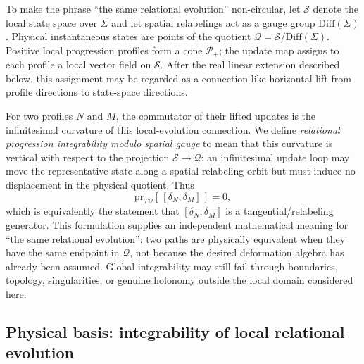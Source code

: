 \documentclass[11pt]{article}
\begin{document}
To make the phrase ``the same relational evolution'' non-circular, let $\mathcal S$ denote the local state space over $\Sigma$ and let spatial relabelings act as a gauge group $\mathrm{Diff}(\Sigma)$. Physical instantaneous states are points of the quotient $\mathcal Q=\mathcal S/\mathrm{Diff}(\Sigma)$. Positive local progression profiles form a cone $\mathcal P_+$; the update map assigns to each profile a local vector field on $\mathcal S$. After the real linear extension described below, this assignment may be regarded as a connection-like horizontal lift from profile directions to state-space directions.

For two profiles $N$ and $M$, the commutator of their lifted updates is the infinitesimal curvature of this local-evolution connection. We define \emph{relational progression integrability modulo spatial gauge} to mean that this curvature is vertical with respect to the projection $\mathcal S\to\mathcal Q$: an infinitesimal update loop may move the representative state along a spatial-relabeling orbit but must induce no displacement in the physical quotient. Thus
\begin{equation}
    \boxed{\mathrm{pr}_{T\mathcal Q}[\,[\delta_N,\delta_M] \,]=0,}
    \label{eq:vertical_curvature}
\end{equation}
which is equivalently the statement that $[\delta_N,\delta_M]$ is a tangential/relabeling generator. This formulation supplies an independent mathematical meaning for ``the same relational evolution'': two paths are physically equivalent when they have the same endpoint in $\mathcal Q$, not because the desired deformation algebra has already been assumed. Global integrability may still fail through boundaries, topology, singularities, or genuine holonomy outside the local domain considered here.

\subsection{Physical basis: integrability of local relational evolution}
\end{document}
